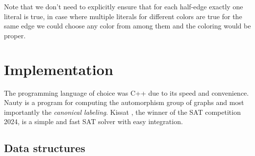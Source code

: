 Note that we don't need to explicitly ensure that for each half-edge exactly one literal is true, in case where multiple literals for different colors are true for the same edge we could choose any color from among them and the coloring would be proper.

\section{Implementation}

The programming language of choice was C++ due to its speed and convenience. Nauty \cite{nauty} is a program for computing the automorphism group of graphs and most importantly the \textit{canonical labeling}. Kissat \cite{kissat}, the winner of the SAT competition 2024, is a simple and fast SAT solver with easy integration.

\subsection{Data structures}

\todo{}
